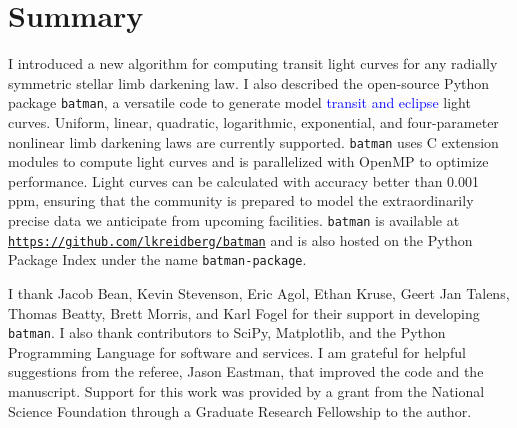 \documentclass[12pt,preprint]{aastex}
\newcommand*{\blue}{\textcolor{blue}}
\begin{document}
\section{Summary}
\label{section:summary}
I introduced a new algorithm for computing transit light curves for any radially symmetric stellar limb darkening law.  I also described the open-source Python package \texttt{batman}, a versatile code to generate model \blue{transit and eclipse} light curves. Uniform, linear, quadratic, logarithmic, exponential, and four-parameter nonlinear limb darkening laws are currently supported.  \texttt{batman} uses C extension modules to compute light curves and is parallelized with OpenMP to optimize performance.  Light curves can be calculated with accuracy better than 0.001 ppm, ensuring that the community is prepared to model the extraordinarily precise data we anticipate from upcoming facilities. \texttt{batman} is available at \texttt{\blue{\url{https://github.com/lkreidberg/batman}}} and is also hosted on the Python Package Index under the name \texttt{batman-package}.

\acknowledgments
I thank Jacob Bean, Kevin Stevenson, Eric Agol, Ethan Kruse, Geert Jan Talens, Thomas Beatty, Brett Morris, and Karl Fogel for their support in developing \texttt{batman}. I also thank contributors to SciPy, Matplotlib, and the Python Programming Language for software and services.  I am grateful for helpful suggestions from the referee, Jason Eastman, that improved the code and the manuscript. Support for this work was provided by a grant from the National Science Foundation through a Graduate Research Fellowship to the author.  




\end{document}
